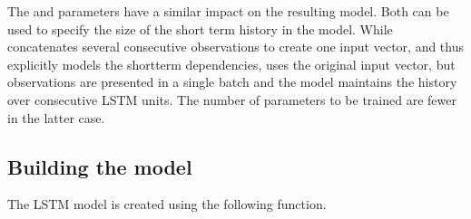 \documentclass[letterpaper,10pt,english]{sphinxmanual}
\begin{document}
The  and  parameters have a similar impact on the resulting model. Both can be used to specify the size of the short term history in the model. While  concatenates several consecutive observations to create one input vector, and thus explicitly models the short\sphinxhyphen{}term dependencies,  uses the original input vector, but  observations are presented in a single batch and the model maintains the history over  consecutive LSTM units. The number of parameters to be trained are fewer in the latter case.


\subsection{Building the model}
\label{\detokenize{manual:building-the-model}}
The LSTM model is created using the following function.
\end{document}
